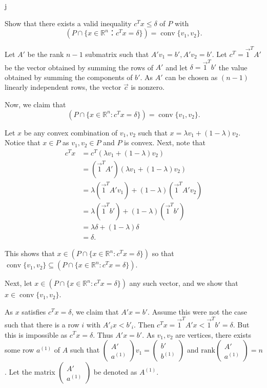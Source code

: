 j\documentclass[11pt]{article}
\DeclareMathOperator{\conv}{conv}
\newcommand{\setR}{\mathbb{R}}
\newcommand{\rank}{\mathrm{rank}}
\begin{document}
\begin{enumerate}[1)]
Show that there exists a valid inequality $c^Tx ≤ δ$ of $P$ with
\begin{displaymath}
 \left( P ∩ \{ x ∈ ℝ^n ： c^Tx = δ \} \right) = \conv\{v_1,v_2\}. 
\end{displaymath}



\begin{solution}
Let $A'$ be the rank $n-1$ submatrix such that $A'v_1 = b', A'v_2 = b'$. Let $c^T = \vec{1}^TA'$ be the vector obtained by summing the rows of $A'$ and let $\delta = \vec{1}^Tb'$ the value obtained by summing the components of $b'$. As $A'$ can be chosen as $(n-1)$ linearly independent rows, the vector $\vec{c}$ is nonzero. 

Now, we claim that $$(P \cap \{x \in \setR^n: c^Tx = \delta\}) = \conv\{v_1, v_2\}.$$

Let $x$ be any convex combination of $v_1, v_2$ such that $x = \lambda v_1 + (1 - \lambda)v_2$. Notice that $x \in P$ as $v_1, v_2 \in P$ and $P$ is convex. Next, note that
\begin{align*}
c^Tx & = c^T ( \lambda v_1 + (1 - \lambda)v_2) \\
& = (\vec{1}^TA') (\lambda v_1 + (1 - \lambda)v_2) \\
& = \lambda (\vec{1}^T A' v_1) + (1-\lambda)(\vec{1}^TA' v_2) \\
& = \lambda (\vec{1}^T b') + (1-\lambda)(\vec{1}^T b') \\
& = \lambda \delta + (1-\lambda)\delta \\
& = \delta. 
\end{align*}

This shows that $x \in (P \cap \{x \in \setR^n: c^Tx = \delta\})$ so that $ \conv\{v_1, v_2\} \subseteq (P \cap \{x \in \setR^n: c^Tx = \delta\})$. 


Next, let $x \in  (P \cap \{x \in \setR^n: c^Tx = \delta\})$ any such vector, and we show that $x \in  \conv\{v_1, v_2\}$. 

As $x$ satisfies $c^Tx = \delta$, we claim that $A'x = b'$. Assume this were not the case such that there is a row $i$ with $A'_i x < b'_i$. Then $c^Tx = \vec{1}^T A' x < \vec{1}^T b' = \delta$. But this is impossible as $c^Tx = \delta$. Thus $A'x = b'$. As $v_1, v_2$ are vertices, there exists some row $a^{(1)}$ of $A$ such that $\begin{pmatrix} A' \\ a^{(1)} \end{pmatrix} v_1 = \begin{pmatrix} b' \\ b^{(1)} \end{pmatrix}$ and $\rank \begin{pmatrix} A' \\ a^{(1)}\end{pmatrix} = n$. Let the matrix $\begin{pmatrix} A' \\ a^{(1)} \end{pmatrix}$ be denoted as $A^{(1)}$. 


\end{solution}
\end{enumerate}
\end{document}
